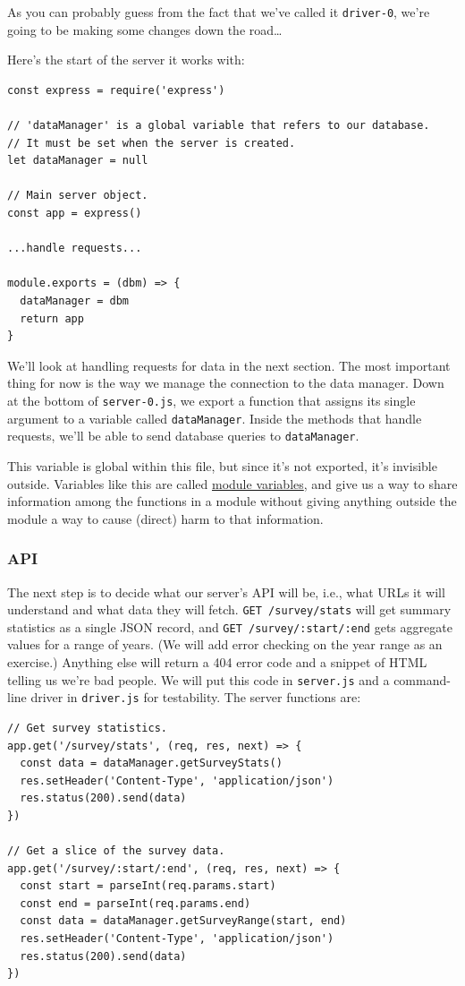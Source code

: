 As you can probably guess from the fact that we've called it
\texttt{driver-0}, we're going to be making some changes down the
road\ldots{}

Here's the start of the server it works with:

\begin{verbatim}
const express = require('express')

// 'dataManager' is a global variable that refers to our database.
// It must be set when the server is created.
let dataManager = null

// Main server object.
const app = express()

...handle requests...

module.exports = (dbm) => {
  dataManager = dbm
  return app
}
\end{verbatim}

We'll look at handling requests for data in the next section. The most
important thing for now is the way we manage the connection to the data
manager. Down at the bottom of \texttt{server-0.js}, we export a
function that assigns its single argument to a variable called
\texttt{dataManager}. Inside the methods that handle requests, we'll be
able to send database queries to \texttt{dataManager}.

This variable is global within this file, but since it's not exported,
it's invisible outside. Variables like this are called
\protect\hyperlink{g:module-variable}{module variables}, and give us a
way to share information among the functions in a module without giving
anything outside the module a way to cause (direct) harm to that
information.

\subsubsection{API}\label{s:capstone-api}

The next step is to decide what our server's API will be, i.e., what
URLs it will understand and what data they will fetch.
\texttt{GET\ /survey/stats} will get summary statistics as a single JSON
record, and \texttt{GET\ /survey/:start/:end} gets aggregate values for
a range of years. (We will add error checking on the year range as an
exercise.) Anything else will return a 404 error code and a snippet of
HTML telling us we're bad people. We will put this code in
\texttt{server.js} and a command-line driver in \texttt{driver.js} for
testability. The server functions are:

\begin{verbatim}
// Get survey statistics.
app.get('/survey/stats', (req, res, next) => {
  const data = dataManager.getSurveyStats()
  res.setHeader('Content-Type', 'application/json')
  res.status(200).send(data)
})

// Get a slice of the survey data.
app.get('/survey/:start/:end', (req, res, next) => {
  const start = parseInt(req.params.start)
  const end = parseInt(req.params.end)
  const data = dataManager.getSurveyRange(start, end)
  res.setHeader('Content-Type', 'application/json')
  res.status(200).send(data)
})
\end{verbatim}

